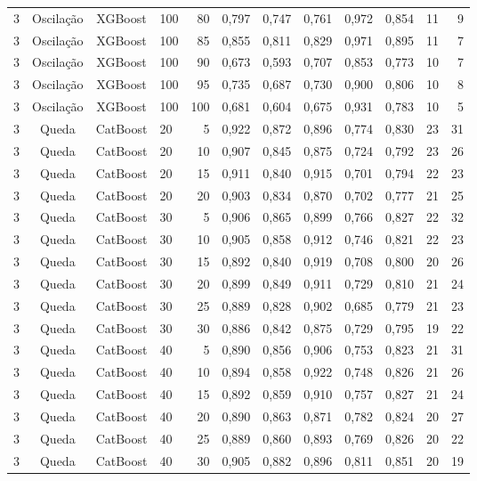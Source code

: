 \begin{longtable}{ccclrrrrrrrr}
3 & Oscilação & XGBoost & 100 & 80 & 0,797 & 0,747 & 0,761 & 0,972 & 0,854 & 11 & 9 \\
3 & Oscilação & XGBoost & 100 & 85 & 0,855 & 0,811 & 0,829 & 0,971 & 0,895 & 11 & 7 \\
3 & Oscilação & XGBoost & 100 & 90 & 0,673 & 0,593 & 0,707 & 0,853 & 0,773 & 10 & 7 \\
3 & Oscilação & XGBoost & 100 & 95 & 0,735 & 0,687 & 0,730 & 0,900 & 0,806 & 10 & 8 \\
3 & Oscilação & XGBoost & 100 & 100 & 0,681 & 0,604 & 0,675 & 0,931 & 0,783 & 10 & 5 \\
3 & Queda & CatBoost & 20 & 5 & 0,922 & 0,872 & 0,896 & 0,774 & 0,830 & 23 & 31 \\
3 & Queda & CatBoost & 20 & 10 & 0,907 & 0,845 & 0,875 & 0,724 & 0,792 & 23 & 26 \\
3 & Queda & CatBoost & 20 & 15 & 0,911 & 0,840 & 0,915 & 0,701 & 0,794 & 22 & 23 \\
3 & Queda & CatBoost & 20 & 20 & 0,903 & 0,834 & 0,870 & 0,702 & 0,777 & 21 & 25 \\
3 & Queda & CatBoost & 30 & 5 & 0,906 & 0,865 & 0,899 & 0,766 & 0,827 & 22 & 32 \\
3 & Queda & CatBoost & 30 & 10 & 0,905 & 0,858 & 0,912 & 0,746 & 0,821 & 22 & 23 \\
3 & Queda & CatBoost & 30 & 15 & 0,892 & 0,840 & 0,919 & 0,708 & 0,800 & 20 & 26 \\
3 & Queda & CatBoost & 30 & 20 & 0,899 & 0,849 & 0,911 & 0,729 & 0,810 & 21 & 24 \\
3 & Queda & CatBoost & 30 & 25 & 0,889 & 0,828 & 0,902 & 0,685 & 0,779 & 21 & 23 \\
3 & Queda & CatBoost & 30 & 30 & 0,886 & 0,842 & 0,875 & 0,729 & 0,795 & 19 & 22 \\
3 & Queda & CatBoost & 40 & 5 & 0,890 & 0,856 & 0,906 & 0,753 & 0,823 & 21 & 31 \\
3 & Queda & CatBoost & 40 & 10 & 0,894 & 0,858 & 0,922 & 0,748 & 0,826 & 21 & 26 \\
3 & Queda & CatBoost & 40 & 15 & 0,892 & 0,859 & 0,910 & 0,757 & 0,827 & 21 & 24 \\
3 & Queda & CatBoost & 40 & 20 & 0,890 & 0,863 & 0,871 & 0,782 & 0,824 & 20 & 27 \\
3 & Queda & CatBoost & 40 & 25 & 0,889 & 0,860 & 0,893 & 0,769 & 0,826 & 20 & 22 \\
3 & Queda & CatBoost & 40 & 30 & 0,905 & 0,882 & 0,896 & 0,811 & 0,851 & 20 & 19 \\

\end{longtable}
